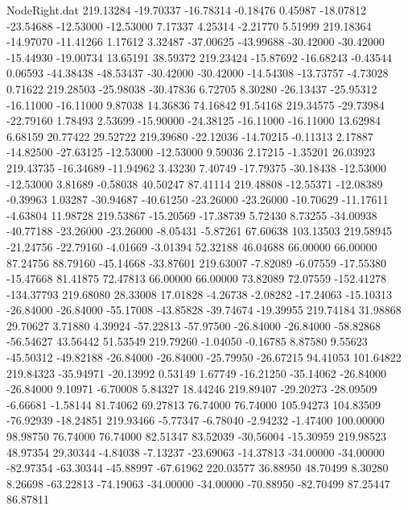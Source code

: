 \begin{filecontents}{NodeRight.dat}
 219.13284  -19.70337  -16.78314    -0.18476    0.45987  -18.07812  -23.54688  -12.53000  -12.53000    7.17337    4.25314   -2.21770    5.51999
 219.18364  -14.97070  -11.41266     1.17612    3.32487  -37.00625  -43.99688  -30.42000  -30.42000  -15.44930  -19.00734   13.65191   38.59372
 219.23424  -15.87692  -16.68243    -0.43544    0.06593  -44.38438  -48.53437  -30.42000  -30.42000  -14.54308  -13.73757   -4.73028    0.71622
 219.28503  -25.98038  -30.47836     6.72705    8.30280  -26.13437  -25.95312  -16.11000  -16.11000    9.87038   14.36836   74.16842   91.54168
 219.34575  -29.73984  -22.79160     1.78493    2.53699  -15.90000  -24.38125  -16.11000  -16.11000   13.62984    6.68159   20.77422   29.52722
 219.39680  -22.12036  -14.70215    -0.11313    2.17887  -14.82500  -27.63125  -12.53000  -12.53000    9.59036    2.17215   -1.35201   26.03923
 219.43735  -16.34689  -11.94962     3.43230    7.40749  -17.79375  -30.18438  -12.53000  -12.53000    3.81689   -0.58038   40.50247   87.41114
 219.48808  -12.55371  -12.08389    -0.39963    1.03287  -30.94687  -40.61250  -23.26000  -23.26000  -10.70629  -11.17611   -4.63804   11.98728
 219.53867  -15.20569  -17.38739     5.72430    8.73255  -34.00938  -40.77188  -23.26000  -23.26000   -8.05431   -5.87261   67.60638  103.13503
 219.58945  -21.24756  -22.79160    -4.01669   -3.01394   52.32188   46.04688   66.00000   66.00000   87.24756   88.79160  -45.14668  -33.87601
 219.63007   -7.82089   -6.07559   -17.55380  -15.47668   81.41875   72.47813   66.00000   66.00000   73.82089   72.07559 -152.41278 -134.37793
 219.68080   28.33008   17.01828    -4.26738   -2.08282  -17.24063  -15.10313  -26.84000  -26.84000  -55.17008  -43.85828  -39.74674  -19.39955
 219.74184   31.98868   29.70627     3.71880    4.39924  -57.22813  -57.97500  -26.84000  -26.84000  -58.82868  -56.54627   43.56442   51.53549
 219.79260   -1.04050   -0.16785     8.87580    9.55623  -45.50312  -49.82188  -26.84000  -26.84000  -25.79950  -26.67215   94.41053  101.64822
 219.84323  -35.94971  -20.13992     0.53149    1.67749  -16.21250  -35.14062  -26.84000  -26.84000    9.10971   -6.70008    5.84327   18.44246
 219.89407  -29.20273  -28.09509    -6.66681   -1.58144   81.74062   69.27813   76.74000   76.74000  105.94273  104.83509  -76.92939  -18.24851
 219.93466   -5.77347   -6.78040    -2.94232   -1.47400  100.00000   98.98750   76.74000   76.74000   82.51347   83.52039  -30.56004  -15.30959
 219.98523   48.97354   29.30344    -4.84038   -7.13237  -23.69063  -14.37813  -34.00000  -34.00000  -82.97354  -63.30344  -45.88997  -67.61962
 220.03577   36.88950   48.70499     8.30280    8.26698  -63.22813  -74.19063  -34.00000  -34.00000  -70.88950  -82.70499   87.25447   86.87811

\end{filecontents}
